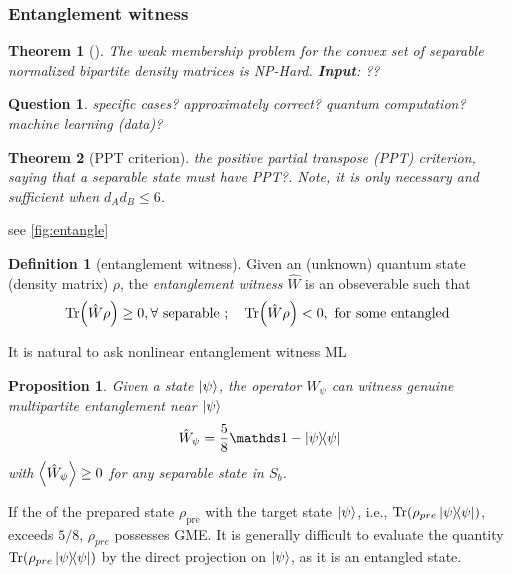 \documentclass[
10pt,
aps,
pra,
linenumbers,
floatfix,
]{revtex4-2}
\theoremstyle{plain}
\newtheorem{theorem}{Theorem}
\newtheorem{proposition}{Proposition}
\newtheorem{question}{Question}
\theoremstyle{definition}
\newtheorem{definition}{Definition}
\newcommand{\ew}{\hat{W}}
\newcommand{\dm}{\rho}
\begin{document}
\subsubsection{Entanglement witness}\label{sec:entanglement_witness}
\begin{theorem}[\cite{gurvitsClassicalDeterministicComplexity2003}]
	The weak membership problem for the convex set of separable normalized bipartite density matrices is NP-Hard.
	\textbf{Input}: ??
\end{theorem}
\begin{question}
	specific cases? approximately correct? quantum computation? machine learning (data)?
\end{question}

\begin{theorem}[PPT criterion]
	the positive partial transpose (PPT) criterion, saying that a separable state must have PPT?.
	Note, it is only necessary and sufficient when $d_A d_B \le 6$.
\end{theorem}
see \cref{fig:entangle}
\begin{definition}[entanglement witness]\label{def:entanglement_witness}
	Given an (unknown) quantum state (density matrix) $\dm$, the \emph{entanglement witness} $\ew$ is an obseverable such that
	\begin{equation}
		\Tr(\ew\dm) \ge 0 , \forall \text{ separable };\quad
		\Tr(\ew\dm) < 0 , \text{ for some entangled }
	\end{equation}
\end{definition}
It is natural to ask nonlinear entanglement witness \cite{guhneNonlinearEntanglementWitnesses2006}  
 ML
\begin{proposition}
	Given a state $\ket{\psi}$,
	the  operator $\ew_{\psi}$ can witness genuine multipartite entanglement near $\ket{\psi}$
	\begin{equation}
		\ew_{\psi} = \frac{5}{8}\identity - \op{\psi} 
	\end{equation}
	with $\expval{\ew_{\psi}}\ge 0$ for any separable state in $S_b$.
\end{proposition}
If the  of the prepared state $\dm_{\text{pre}}$ with the target state $\ket{\psi}$, i.e., $\Tr(\dm_{pre}\op{\psi})$, exceeds $5/8$, $\dm_{pre}$ possesses GME.
It is generally difficult to evaluate the quantity $\Tr(\dm_{pre}\op{\psi})$ by the direct projection on $\ket{\psi}$, as it is an entangled state.
\end{document}
